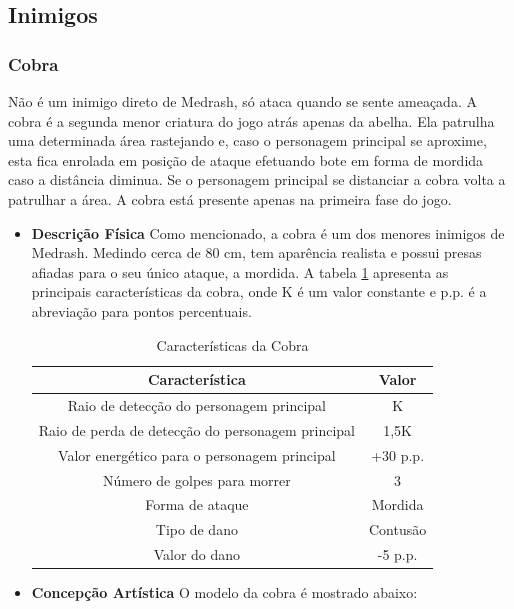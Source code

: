 \subsection{Inimigos}
\subsubsection{Cobra}
Não é um inimigo direto de Medrash, só ataca quando se sente ameaçada. A
 cobra é a segunda menor criatura do jogo atrás apenas da abelha. Ela
 patrulha uma determinada área rastejando e, caso o personagem principal se
 aproxime, esta fica enrolada em posição de ataque efetuando bote em forma
 de mordida caso a distância diminua. Se o personagem principal se
 distanciar a cobra volta a patrulhar a área. A cobra está presente apenas
 na primeira fase do jogo.
\begin{itemize}
\item {\bf Descrição Física}
Como mencionado, a cobra é um dos menores inimigos de Medrash. Medindo
 cerca de 80 cm, tem aparência realista e possui presas afiadas para o seu
 único ataque, a mordida. A tabela \ref{table:cobra} apresenta as principais
 características da cobra, onde K é um valor constante e p.p. é a
 abreviação para pontos percentuais.
\begin{table}[H]
\begin{center}
\begin{tabular}{|c|c|}
\hline 
\textbf{Característica} & \textbf{Valor} \\ 
\hline 
Raio de detecção do personagem principal & K \\ 
\hline 
Raio de perda de detecção do personagem principal & 1,5K \\ 
\hline 
Valor energético para o personagem principal & +30 p.p. \\ 
\hline 
Número de golpes para morrer & 3 \\ 
\hline 
Forma de ataque & Mordida \\ 
\hline 
Tipo de dano & Contusão \\ 
\hline 
Valor do dano & -5 p.p. \\ 
\hline 
\end{tabular} 
\end{center}
\caption{Características da Cobra}
\label{table:cobra}
\end{table}
\item {\bf Concepção Artística}
O modelo da cobra é mostrado abaixo:



\end{itemize}
